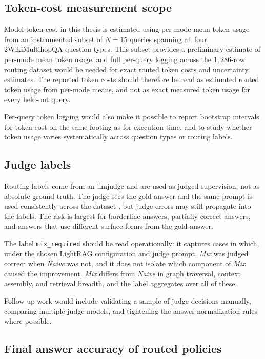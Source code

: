 \documentclass[english, bibtex]{kththesis}               %
\numberwithin{listing}{chapter}
\begin{document}
\subsection{Token-cost measurement scope}
\label{sec:limitTokenCost}

Model-token cost in this thesis is estimated using per-mode mean token usage from an instrumented subset of \(N = 15\) queries spanning all four 2WikiMultihopQA question types. This subset provides a preliminary estimate of per-mode mean token usage, and full per-query logging across the $1{,}286$-row routing dataset would be needed for exact routed token costs and uncertainty estimates. The reported token costs should therefore be read as estimated routed token usage from per-mode means, and not as exact measured token usage for every held-out query.

Per-query token logging would also make it possible to report bootstrap intervals for token cost on the same footing as for execution time, and to study whether token usage varies systematically across question types or routing labels.

\subsection{Judge labels}
\label{sec:limitJudgeLabels}

Routing labels come from an \gls{llmjudge} and are used as judged supervision, not as absolute ground truth. The judge sees the gold answer and the same prompt is used consistently across the dataset \cite{zheng2023judge}, but judge errors may still propagate into the labels. The risk is largest for borderline answers, partially correct answers, and answers that use different surface forms from the gold answer.

The label \texttt{mix\_required} should be read operationally: it captures cases in which, under the chosen LightRAG configuration and judge prompt, \emph{Mix} was judged correct when \emph{Naive} was not, and it does not isolate which component of \emph{Mix} caused the improvement. \emph{Mix} differs from \emph{Naive} in graph traversal, context assembly, and retrieval breadth, and the label aggregates over all of these.

Follow-up work would include validating a sample of judge decisions manually, comparing multiple judge models, and tightening the answer-normalization rules where possible.

\subsection{Final answer accuracy of routed policies}
\label{sec:limitFinalAnswerAccuracy}
\end{document}
